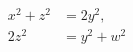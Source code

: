 \begin{proposition}
\[
    \begin{aligned}x^2+z^2&=2y^2,\\2z^2&=y^2+w^2\end{aligned}
\]
\end{proposition}
